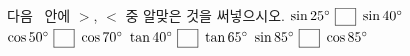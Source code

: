 다음 \blank\ 안에 $>$, $<$ 중 알맞은 것을 써넣으시오.
 $\sin 25^\circ\ \blank\ \sin 40^\circ$
 $\cos 50^\circ\ \blank\ \cos 70^\circ$
 $\tan 40^\circ\ \blank\ \tan 65^\circ$
 $\sin 85^\circ\ \blank\ \cos 85^\circ$
